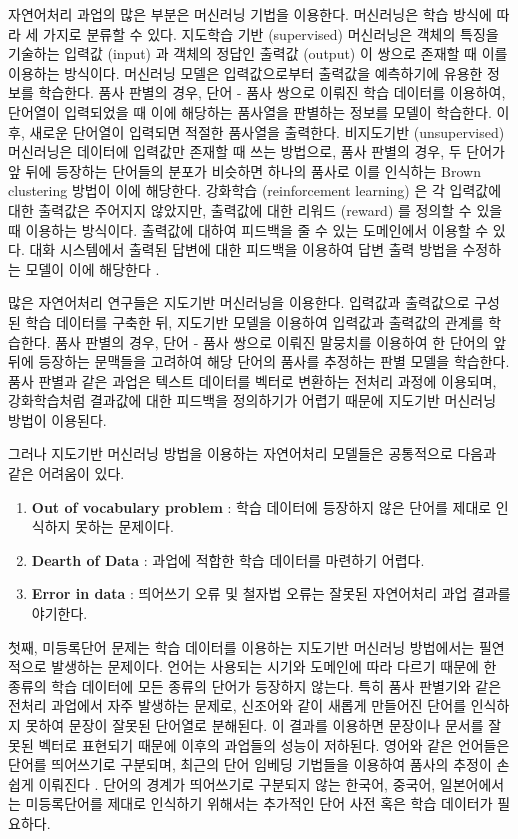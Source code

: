 \documentclass[oneside, ko,phd]{snuthesis_utf8_kor}
\begin{document}
자연어처리 과업의 많은 부분은 머신러닝 기법을 이용한다.
머신러닝은 학습 방식에 따라 세 가지로 분류할 수 있다.
지도학습 기반 (supervised) 머신러닝은 객체의 특징을 기술하는 입력값 (input) 과 객체의 정답인 출력값 (output) 이 쌍으로 존재할 때 이를 이용하는 방식이다.
머신러닝 모델은 입력값으로부터 출력값을 예측하기에 유용한 정보를 학습한다.
품사 판별의 경우, 단어 - 품사 쌍으로 이뤄진 학습 데이터를 이용하여, 단어열이 입력되었을 때 이에 해당하는 품사열을 판별하는 정보를 모델이 학습한다.
이후, 새로운 단어열이 입력되면 적절한 품사열을 출력한다.
비지도기반 (unsupervised) 머신러닝은 데이터에 입력값만 존재할 때 쓰는 방법으로, 품사 판별의 경우, 두 단어가 앞 뒤에 등장하는 단어들의 분포가 비슷하면 하나의 품사로 이를 인식하는 Brown clustering \cite{brown1992class} 방법이 이에 해당한다.
강화학습 (reinforcement learning) 은 각 입력값에 대한 출력값은 주어지지 않았지만, 출력값에 대한 리워드 (reward) 를 정의할 수 있을 때 이용하는 방식이다.
출력값에 대하여 피드백을 줄 수 있는 도메인에서 이용할 수 있다.
대화 시스템에서 출력된 답변에 대한 피드백을 이용하여 답변 출력 방법을 수정하는 모델이 이에 해당한다 \cite{mo2018personalizing, singh2000reinforcement, li2016deep}. 

많은 자연어처리 연구들은 지도기반 머신러닝을 이용한다.
입력값과 출력값으로 구성된 학습 데이터를 구축한 뒤, 지도기반 모델을 이용하여 입력값과 출력값의 관계를 학습한다.
품사 판별의 경우, 단어 - 품사 쌍으로 이뤄진 말뭉치를 이용하여 한 단어의 앞 뒤에 등장하는 문맥들을 고려하여 해당 단어의 품사를 추정하는 판별 모델을 학습한다.
품사 판별과 같은 과업은 텍스트 데이터를 벡터로 변환하는 전처리 과정에 이용되며, 강화학습처럼 결과값에 대한 피드백을 정의하기가 어렵기 때문에 지도기반 머신러닝 방법이 이용된다.

그러나 지도기반 머신러닝 방법을 이용하는 자연어처리 모델들은 공통적으로 다음과 같은 어려움이 있다.

\begin{enumerate}
    \item \textbf{Out of vocabulary problem} : 학습 데이터에 등장하지 않은 단어를 제대로 인식하지 못하는 문제이다.
    \item \textbf{Dearth of Data} : 과업에 적합한 학습 데이터를 마련하기 어렵다.
    \item \textbf{Error in data} : 띄어쓰기 오류 및 철자법 오류는 잘못된 자연어처리 과업 결과를 야기한다.
\end{enumerate}

첫째, 미등록단어 문제는 학습 데이터를 이용하는 지도기반 머신러닝 방법에서는 필연적으로 발생하는 문제이다.
언어는 사용되는 시기와 도메인에 따라 다르기 때문에 한 종류의 학습 데이터에 모든 종류의 단어가 등장하지 않는다.
특히 품사 판별기와 같은 전처리 과업에서 자주 발생하는 문제로, 신조어와 같이 새롭게 만들어진 단어를 인식하지 못하여 문장이 잘못된 단어열로 분해된다.
이 결과를 이용하면 문장이나 문서를 잘못된 벡터로 표현되기 때문에 이후의 과업들의 성능이 저하된다.
영어와 같은 언어들은 단어를 띄어쓰기로 구분되며, 최근의 단어 임베딩 기법들을 이용하여 품사의 추정이 손쉽게 이뤄진다 \cite{turian2010word, mikolov2013efficient, collobert2011natural}.
단어의 경계가 띄어쓰기로 구분되지 않는 한국어, 중국어, 일본어에서는 미등록단어를 제대로 인식하기 위해서는 추가적인 단어 사전 혹은 학습 데이터가 필요하다.
\end{document}
